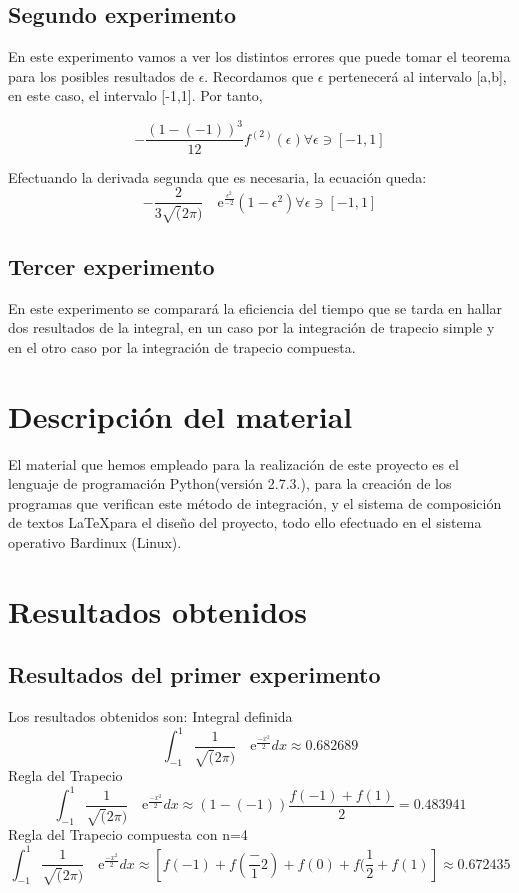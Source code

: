 \subsection{Segundo experimento}
En este experimento vamos a ver los distintos errores que puede tomar el teorema para los posibles resultados de $\epsilon$.
Recordamos que $\epsilon$ pertenecerá al intervalo [a,b], en este caso, el intervalo [-1,1].
Por tanto,

\[
-\frac{\left(1-(-1)\right)^3}{12}  \displaystyle f^{(2)}(\epsilon)

\forall \epsilon \owns [-1,1]
\]


Efectuando la derivada segunda que es necesaria, la ecuación queda:
\[
-\frac{2}{3\sqrt(2\pi)} \quad\text{e}^{\frac{\epsilon^2}{-2}}  \displaystyle  (1-\epsilon^2)

\forall \epsilon \owns [-1,1]
\]



\subsection{Tercer experimento}
En este experimento se comparará la eficiencia del tiempo que se tarda en hallar dos resultados de la integral, en un caso
 por la integración de trapecio simple y en el otro caso por la integración de trapecio compuesta.



\section{Descripción del material}
\label{3:sec:2}
\parindent=0.2cm
\raggedright
El material que hemos empleado para la realización de este proyecto es el lenguaje de
programación Python(versión 2.7.3.), para la creación de los programas que verifican este método de integración, 
y el sistema de composición de textos \LaTeX para el diseño del proyecto, todo ello efectuado en el sistema operativo
Bardinux (Linux).


\section{Resultados obtenidos}
\label{3:sec:3}
\parindent=0.2cm
\raggedright
\subsection{Resultados del primer experimento}
Los resultados obtenidos son:
Integral definida 
\[
\int_{-1}^{1} \frac{1}{\sqrt(2\pi)} \quad\text{e}^{\frac{-x^2}{2}}dx\approx0.682689 
\]
Regla del Trapecio
\[
\int_{-1}^{1} \frac{1}{\sqrt(2\pi)} \quad\text{e}^{\frac{-x^2}{2}}dx\approx\left(1-(-1)\right)\frac{f(-1)+f(1)}{2}=0.483941
\]
Regla del Trapecio compuesta con n=4
\[
\int_{-1}^{1} \frac{1}{\sqrt(2\pi)} \quad\text{e}^{\frac{-x^2}{2}}dx\approx\left[f(-1) + f(\frac-{1}{2}) + f(0) + f(\frac{1}{2} + f(1)\right]\approx0.672435
\]

